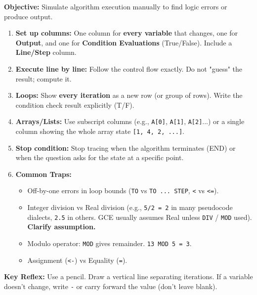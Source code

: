 \documentclass[11pt]{article}
\begin{document}
\begin{methode}
\textbf{Objective:} Simulate algorithm execution manually to find logic errors or produce output.
\begin{enumerate}
    \item \textbf{Set up columns:} One column for \textbf{every variable} that changes, one for \textbf{Output}, and one for \textbf{Condition Evaluations} (True/False). Include a \textbf{Line/Step} column.
    \item \textbf{Execute line by line:} Follow the control flow exactly. Do not "guess" the result; compute it.
    \item \textbf{Loops:} Show \textbf{every iteration} as a new row (or group of rows). Write the condition check result explicitly (T/F).
    \item \textbf{Arrays/Lists:} Use subscript columns (e.g., \texttt{A[0]}, \texttt{A[1]}, \texttt{A[2]}...) or a single column showing the whole array state \texttt{[1, 4, 2, ...]}.
    \item \textbf{Stop condition:} Stop tracing when the algorithm terminates (END) or when the question asks for the state at a specific point.
    \item \textbf{Common Traps:}
        \begin{itemize}
            \item Off-by-one errors in loop bounds (\texttt{TO} vs \texttt{TO ... STEP}, \texttt{<} vs \texttt{<=}).
            \item Integer division vs Real division (e.g., \texttt{5/2 = 2} in many pseudocode dialects, \texttt{2.5} in others. GCE usually assumes Real unless \texttt{DIV} / \texttt{MOD} used). \textbf{Clarify assumption.}
            \item Modulo operator: \texttt{MOD} gives remainder. \texttt{13 MOD 5 = 3}.
            \item Assignment (\texttt{<-}) vs Equality (\texttt{=}).
        \end{itemize}
\end{enumerate}
\textbf{Key Reflex:} Use a pencil. Draw a vertical line separating iterations. If a variable doesn't change, write \texttt{-} or carry forward the value (don't leave blank).
\end{methode}
\end{document}
